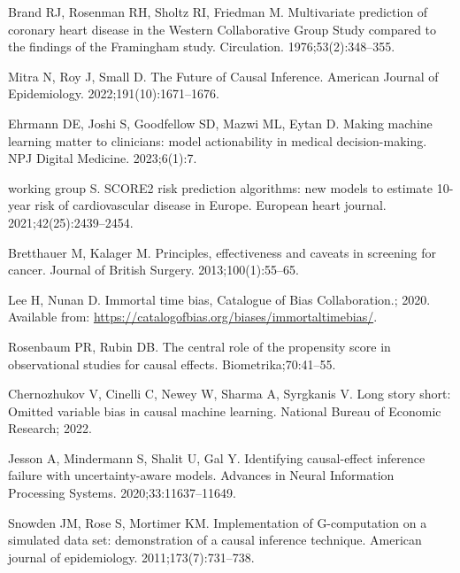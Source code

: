 \documentclass[10pt,letterpaper]{article}
\begin{document}
\begin{thebibliography}{100}
  Brand RJ, Rosenman RH, Sholtz RI, Friedman M.
  \newblock Multivariate prediction of coronary heart disease in the Western Collaborative Group Study compared to the findings of the Framingham study.
  \newblock Circulation. 1976;53(2):348--355.

  Mitra N, Roy J, Small D.
  \newblock The Future of Causal Inference.
  \newblock American Journal of Epidemiology. 2022;191(10):1671--1676.

  Ehrmann DE, Joshi S, Goodfellow SD, Mazwi ML, Eytan D.
  \newblock Making machine learning matter to clinicians: model actionability in medical decision-making.
  \newblock NPJ Digital Medicine. 2023;6(1):7.

  working group S.
  \newblock SCORE2 risk prediction algorithms: new models to estimate 10-year risk of cardiovascular disease in Europe.
  \newblock European heart journal. 2021;42(25):2439--2454.

  Bretthauer M, Kalager M.
  \newblock Principles, effectiveness and caveats in screening for cancer.
  \newblock Journal of British Surgery. 2013;100(1):55--65.

  Lee H, Nunan D. Immortal time bias, Catalogue of Bias Collaboration.; 2020.
  \newblock Available from: \url{https://catalogofbias.org/biases/immortaltimebias/}.

  Rosenbaum PR, Rubin DB.
  \newblock The central role of the propensity score in observational studies for causal effects.
  \newblock Biometrika;70:41--55.

  Chernozhukov V, Cinelli C, Newey W, Sharma A, Syrgkanis V.
  \newblock Long story short: Omitted variable bias in causal machine learning.
  \newblock National Bureau of Economic Research; 2022.

  Jesson A, Mindermann S, Shalit U, Gal Y.
  \newblock Identifying causal-effect inference failure with uncertainty-aware models.
  \newblock Advances in Neural Information Processing Systems. 2020;33:11637--11649.

  Snowden JM, Rose S, Mortimer KM.
  \newblock Implementation of G-computation on a simulated data set: demonstration of a causal inference technique.
  \newblock American journal of epidemiology. 2011;173(7):731--738.


\end{thebibliography}
\end{document}
